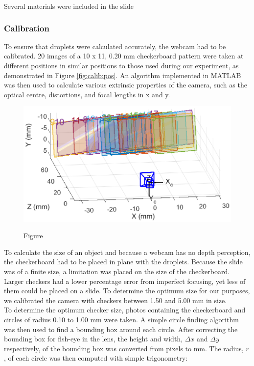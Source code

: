 \documentclass{physics_article_B}
\begin{document}
            Several materials were included in the slide
    
            \subsubsection{Calibration}

            To ensure that droplets were calculated accurately, the webcam had to be calibrated. 20 images of a 10 x 11, 0.20 mm checkerboard pattern were taken at different positions in similar positions to those used during our experiment, as demonstrated in Figure \ref{fig:calib:pos}. An algorithm implemented in MATLAB\cite{CameraCalib} was then used to calculate various extrinsic properties of the camera, such as the optical centre, distortions, and focal lengths in x and y. 
            
            \begin{figure}[H]
                \centering
                    \includegraphics[]{Figures/CameraExtrinsics.eps}
                    \label{fig:calib:pos}
                \caption{Figure }\label{fig:calib}
            \end{figure}
            
            To calculate the size of an object and because a webcam has no depth perception, the checkerboard had to be placed in plane with the droplets. Because the slide was of a finite size, a limitation was placed on the size of the checkerboard. Larger checkers had a lower percentage error from imperfect focusing, yet less of them could be placed on a slide. To determine the optimum size for our purposes, we calibrated the camera with checkers between 1.50 and 5.00 mm in size. \\
            
            To determine the optimum checker size, photos containing the checkerboard and circles of radius 0.10 to 1.00 mm were taken. A simple circle finding algorithm was then used to find a bounding box around each circle. After correcting the bounding box for fish-eye in the lens, the height and width, $\Delta x$ and $\Delta y$ respectively, of the bounding box was converted from pixels to mm. The radius, $r$, of each circle was then computed with simple trigonometry:
            
\end{document}

